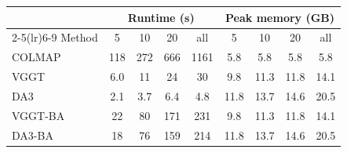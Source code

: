 \begin{tabular}{lcccccccc}
\toprule
 & \multicolumn{4}{c}{Runtime (s)} & \multicolumn{4}{c}{Peak memory (GB)} \\
\cmidrule(lr){2-5}\cmidrule(lr){6-9}
Method & 5 & 10 & 20 & all & 5 & 10 & 20 & all \\
\midrule
COLMAP & 118 & 272 & 666 & 1161 & 5.8 & 5.8 & 5.8 & 5.8 \\
VGGT & 6.0 & 11 & 24 & 30 & 9.8 & 11.3 & 11.8 & 14.1 \\
DA3 & 2.1 & 3.7 & 6.4 & 4.8 & 11.8 & 13.7 & 14.6 & 20.5 \\
VGGT-BA & 22 & 80 & 171 & 231 & 9.8 & 11.3 & 11.8 & 14.1 \\
DA3-BA & 18 & 76 & 159 & 214 & 11.8 & 13.7 & 14.6 & 20.5 \\
\bottomrule
\end{tabular}
